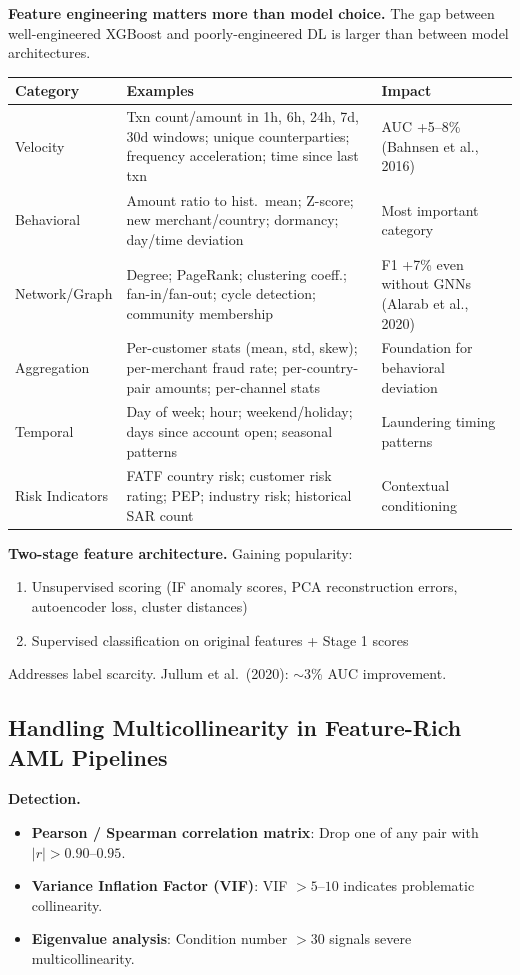 \documentclass[11pt]{article}
\begin{document}
\textbf{Feature engineering matters more than model choice.} The gap between well-engineered XGBoost and poorly-engineered DL is larger than between model architectures.

\begin{center}
\small
\begin{tabular}{p{2.5cm}p{5cm}p{4cm}}
\toprule
\textbf{Category} & \textbf{Examples} & \textbf{Impact} \\
\midrule
Velocity & Txn count/amount in 1h, 6h, 24h, 7d, 30d windows; unique counterparties; frequency acceleration; time since last txn & AUC +5--8\% (Bahnsen et al., 2016) \\
Behavioral & Amount ratio to hist.\ mean; Z-score; new merchant/country; dormancy; day/time deviation & Most important category \\
Network/Graph & Degree; PageRank; clustering coeff.; fan-in/fan-out; cycle detection; community membership & F1 +7\% even without GNNs (Alarab et al., 2020) \\
Aggregation & Per-customer stats (mean, std, skew); per-merchant fraud rate; per-country-pair amounts; per-channel stats & Foundation for behavioral deviation \\
Temporal & Day of week; hour; weekend/holiday; days since account open; seasonal patterns & Laundering timing patterns \\
Risk Indicators & FATF country risk; customer risk rating; PEP; industry risk; historical SAR count & Contextual conditioning \\
\bottomrule
\end{tabular}
\end{center}

\textbf{Two-stage feature architecture.} Gaining popularity:
\begin{enumerate}
\item Unsupervised scoring (IF anomaly scores, PCA reconstruction errors, autoencoder loss, cluster distances)
\item Supervised classification on original features + Stage 1 scores
\end{enumerate}
Addresses label scarcity. Jullum et al.\ (2020): $\sim$3\% AUC improvement.

\subsection{Handling Multicollinearity in Feature-Rich AML Pipelines}

\textbf{Detection.}
\begin{itemize}
\item \textbf{Pearson / Spearman correlation matrix}: Drop one of any pair with $|r| > 0.90$--$0.95$.
\item \textbf{Variance Inflation Factor (VIF)}: VIF $> 5$--$10$ indicates problematic collinearity.
\item \textbf{Eigenvalue analysis}: Condition number $> 30$ signals severe multicollinearity.
\end{itemize}
\end{document}
